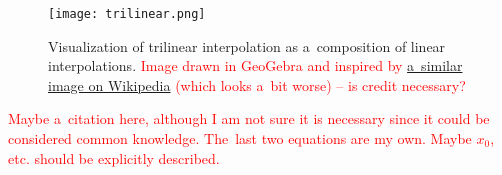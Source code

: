 				
				\begin{figure}[H]
					\centering
					\texttt{[image: trilinear.png]}
					\caption{Visualization of trilinear interpolation as a~composition of linear interpolations. \textcolor{red}{Image drawn in GeoGebra and inspired by \href{https://commons.wikimedia.org/wiki/File:3D_interpolation2.svg}{a~similar image on Wikipedia} (which looks a~bit worse) -- is credit necessary?}}
					\label{fig:trilin}
				\end{figure}
				
				\textcolor{red}{Maybe a~citation here, although I am not sure it is necessary since it could be considered common knowledge. The~last two equations are my own. Maybe $x_0$, etc. should be explicitly described.}
